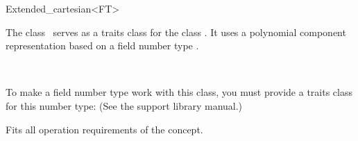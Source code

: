 
\ccAutoIndexingOff
\begin{ccRefClass}{Extended_cartesian<FT>}
\ccAutoIndexingOn
{}

\ccDefinition
  
The class \ccRefName\ serves as a traits class for the class
.  It uses a polynomial component
representation based on a field number type .


\ccIsModel

%
 \\

\ccCreation
{}  %



To make a field number type  work with this class, you
must provide a traits class for this number type:
 (See the support library manual.)

\ccOperations

Fits all operation requirements of the concept.

\ccSeeAlso

 \\


\ccIndexTraitsClassEnd
\ccAutoIndexingOff
\end{ccRefClass}
\ccAutoIndexingOn

